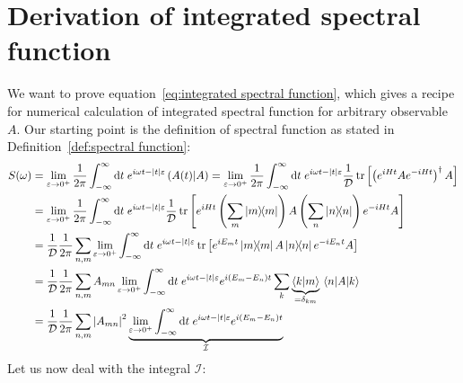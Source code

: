 \chapter{Derivation of integrated spectral function\label{app:spectral}}
\thispagestyle{chapterBeginStyle}
We want to prove equation~\eqref{eq:integrated spectral function}, which gives
a recipe for numerical calculation of integrated spectral function for arbitrary observable \(A\).
Our starting point is the definition of spectral function as stated in Definition~\ref{def:spectral function}:
\begin{align}
        S(\omega) &=  \lim _{\varepsilon \to 0^+} \frac{1}{2 \pi} \int_{-\infty}^{\infty} \mathrm{d} t 
        \; e^{i \omega t-|t| \varepsilon}\hs{A(t)}{A} = \lim _{\varepsilon \to 0^+} \frac{1}{2 \pi}
        \int_{-\infty}^{\infty} \mathrm{d} t \; e^{i \omega t-|t| \varepsilon} \frac{1}{\dimension}
        \tr\left[\left(e^{iHt}Ae^{-iHt}\right)^{\dagger}A\right] \nonumber\\
        &=\lim _{\varepsilon \to 0^+} \frac{1}{2 \pi}
        \int_{-\infty}^{\infty} \mathrm{d} t \; e^{i \omega t-|t| \varepsilon} \frac{1}{\dimension}
        \tr\left[e^{iHt}\left(\sum_{m} \ketbra{m}{m}\right) 
        A\left(\sum_{n} \ketbra{n}{n}\right)e^{-iHt}A\right] \nonumber\\
        &= \frac{1}{\dimension} \frac{1}{2 \pi}\sum_{n,m} \lim _{\varepsilon \to 0^+} 
        \int_{-\infty}^{\infty} \mathrm{d} t \; e^{i \omega t-|t| \varepsilon}
        \tr\left[e^{i E_m t}\ketbra{m}{m} A\ketbra{n}{n}e^{-i E_n t}A\right] \nonumber\\
        &= \frac{1}{\dimension} \frac{1}{2 \pi}\sum_{n,m} A_{mn}  \lim _{\varepsilon \to 0^+} 
        \int_{-\infty}^{\infty} \mathrm{d} t \; e^{i \omega t-|t| \varepsilon}e^{i (E_m-E_n) t}
        \sum_{k} \underbrace{\braket{k}{m}}_{=\delta_{km}} \matrixel{n}{A}{k} \nonumber\\
        &= \frac{1}{\dimension} \frac{1}{2 \pi}\sum_{n,m} \abs{A_{mn}}^2  \underbrace{\lim _{\varepsilon 
        \to 0^+} \int_{-\infty}^{\infty} \mathrm{d} t \; e^{i \omega t-|t| 
        \varepsilon}e^{i (E_m-E_n) t}}_{\mathcal{I}}\label{eq:spectral function simplified}
\end{align}
Let us now deal with the integral \(\mathcal{I}\):
